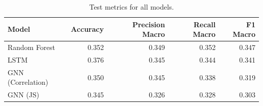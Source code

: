 \begin{table}
\caption{Test metrics for all models.}
\label{tab:test_metrics}
\begin{tabular}{lrrrr}
\toprule
Model & Accuracy & Precision Macro & Recall Macro & F1 Macro \\
\midrule
Random Forest & 0.352 & 0.349 & 0.352 & 0.347 \\
LSTM & 0.376 & 0.345 & 0.344 & 0.341 \\
GNN (Correlation) & 0.350 & 0.345 & 0.338 & 0.319 \\
GNN (JS) & 0.345 & 0.326 & 0.328 & 0.303 \\
\bottomrule
\end{tabular}
\end{table}
